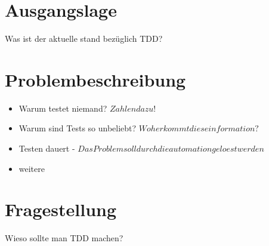 \section{Ausgangslage}
Was ist der aktuelle stand bezüglich TDD?

\section{Problembeschreibung}
\begin{itemize}
	\item Warum testet niemand? $Zahlen dazu!$
	\item Warum sind Tests so unbeliebt? $Woher kommt diese information?$
	\item Testen dauert - $Das Problem soll durch die automation geloest werden$
	\item weitere
\end{itemize}

\section{Fragestellung}
Wieso sollte man TDD machen?